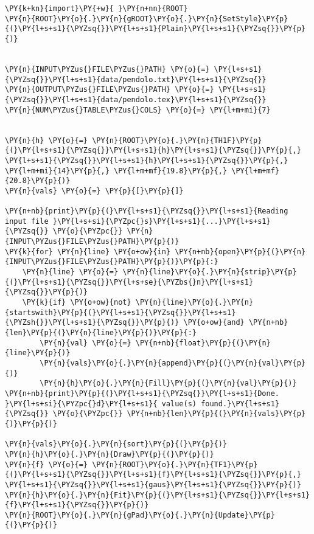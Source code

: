 \begin{Verbatim}[label=\makebox{\href{https://github.com/unipi-physics-labs/lab1-sheets/tree/main/snippy/pendolo.py}{https://github.com/.../pendolo.py}},commandchars=\\\{\}]
\PY{k+kn}{import}\PY{+w}{ }\PY{n+nn}{ROOT}
\PY{n}{ROOT}\PY{o}{.}\PY{n}{gROOT}\PY{o}{.}\PY{n}{SetStyle}\PY{p}{(}\PY{l+s+s1}{\PYZsq{}}\PY{l+s+s1}{Plain}\PY{l+s+s1}{\PYZsq{}}\PY{p}{)}


\PY{n}{INPUT\PYZus{}FILE\PYZus{}PATH} \PY{o}{=} \PY{l+s+s1}{\PYZsq{}}\PY{l+s+s1}{data/pendolo.txt}\PY{l+s+s1}{\PYZsq{}}
\PY{n}{OUTPUT\PYZus{}FILE\PYZus{}PATH} \PY{o}{=} \PY{l+s+s1}{\PYZsq{}}\PY{l+s+s1}{data/pendolo.tex}\PY{l+s+s1}{\PYZsq{}}
\PY{n}{NUM\PYZus{}TABLE\PYZus{}COLS} \PY{o}{=} \PY{l+m+mi}{7}


\PY{n}{h} \PY{o}{=} \PY{n}{ROOT}\PY{o}{.}\PY{n}{TH1F}\PY{p}{(}\PY{l+s+s1}{\PYZsq{}}\PY{l+s+s1}{h}\PY{l+s+s1}{\PYZsq{}}\PY{p}{,} \PY{l+s+s1}{\PYZsq{}}\PY{l+s+s1}{h}\PY{l+s+s1}{\PYZsq{}}\PY{p}{,} \PY{l+m+mi}{14}\PY{p}{,} \PY{l+m+mf}{19.8}\PY{p}{,} \PY{l+m+mf}{20.8}\PY{p}{)}
\PY{n}{vals} \PY{o}{=} \PY{p}{[}\PY{p}{]}

\PY{n+nb}{print}\PY{p}{(}\PY{l+s+s1}{\PYZsq{}}\PY{l+s+s1}{Reading input file }\PY{l+s+si}{\PYZpc{}s}\PY{l+s+s1}{...}\PY{l+s+s1}{\PYZsq{}} \PY{o}{\PYZpc{}} \PY{n}{INPUT\PYZus{}FILE\PYZus{}PATH}\PY{p}{)}
\PY{k}{for} \PY{n}{line} \PY{o+ow}{in} \PY{n+nb}{open}\PY{p}{(}\PY{n}{INPUT\PYZus{}FILE\PYZus{}PATH}\PY{p}{)}\PY{p}{:}
    \PY{n}{line} \PY{o}{=} \PY{n}{line}\PY{o}{.}\PY{n}{strip}\PY{p}{(}\PY{l+s+s1}{\PYZsq{}}\PY{l+s+se}{\PYZbs{}n}\PY{l+s+s1}{\PYZsq{}}\PY{p}{)}
    \PY{k}{if} \PY{o+ow}{not} \PY{n}{line}\PY{o}{.}\PY{n}{startswith}\PY{p}{(}\PY{l+s+s1}{\PYZsq{}}\PY{l+s+s1}{\PYZsh{}}\PY{l+s+s1}{\PYZsq{}}\PY{p}{)} \PY{o+ow}{and} \PY{n+nb}{len}\PY{p}{(}\PY{n}{line}\PY{p}{)}\PY{p}{:}
        \PY{n}{val} \PY{o}{=} \PY{n+nb}{float}\PY{p}{(}\PY{n}{line}\PY{p}{)}
        \PY{n}{vals}\PY{o}{.}\PY{n}{append}\PY{p}{(}\PY{n}{val}\PY{p}{)}
        \PY{n}{h}\PY{o}{.}\PY{n}{Fill}\PY{p}{(}\PY{n}{val}\PY{p}{)}
\PY{n+nb}{print}\PY{p}{(}\PY{l+s+s1}{\PYZsq{}}\PY{l+s+s1}{Done. }\PY{l+s+si}{\PYZpc{}d}\PY{l+s+s1}{ value(s) found.}\PY{l+s+s1}{\PYZsq{}} \PY{o}{\PYZpc{}} \PY{n+nb}{len}\PY{p}{(}\PY{n}{vals}\PY{p}{)}\PY{p}{)}

\PY{n}{vals}\PY{o}{.}\PY{n}{sort}\PY{p}{(}\PY{p}{)}
\PY{n}{h}\PY{o}{.}\PY{n}{Draw}\PY{p}{(}\PY{p}{)}
\PY{n}{f} \PY{o}{=} \PY{n}{ROOT}\PY{o}{.}\PY{n}{TF1}\PY{p}{(}\PY{l+s+s1}{\PYZsq{}}\PY{l+s+s1}{f}\PY{l+s+s1}{\PYZsq{}}\PY{p}{,} \PY{l+s+s1}{\PYZsq{}}\PY{l+s+s1}{gaus}\PY{l+s+s1}{\PYZsq{}}\PY{p}{)}
\PY{n}{h}\PY{o}{.}\PY{n}{Fit}\PY{p}{(}\PY{l+s+s1}{\PYZsq{}}\PY{l+s+s1}{f}\PY{l+s+s1}{\PYZsq{}}\PY{p}{)}
\PY{n}{ROOT}\PY{o}{.}\PY{n}{gPad}\PY{o}{.}\PY{n}{Update}\PY{p}{(}\PY{p}{)}


\end{Verbatim}

